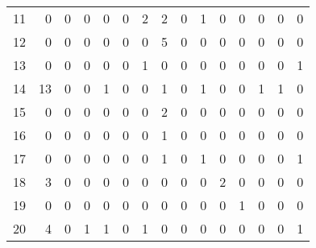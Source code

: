 \begin{tabular}{lrrrrrrrrrrrrrr}
11       &    0 &           0 &               0 &            0 &      0 &        2 &      2 &    0 &    1 &         0 &           0 &       0 &         0 &       0 \\
12       &    0 &           0 &               0 &            0 &      0 &        0 &      5 &    0 &    0 &         0 &           0 &       0 &         0 &       0 \\
13       &    0 &           0 &               0 &            0 &      0 &        1 &      0 &    0 &    0 &         0 &           0 &       0 &         0 &       1 \\
14       &   13 &           0 &               0 &            1 &      0 &        0 &      1 &    0 &    1 &         0 &           0 &       1 &         1 &       0 \\
15       &    0 &           0 &               0 &            0 &      0 &        0 &      2 &    0 &    0 &         0 &           0 &       0 &         0 &       0 \\
16       &    0 &           0 &               0 &            0 &      0 &        0 &      1 &    0 &    0 &         0 &           0 &       0 &         0 &       0 \\
17       &    0 &           0 &               0 &            0 &      0 &        0 &      1 &    0 &    1 &         0 &           0 &       0 &         0 &       1 \\
18       &    3 &           0 &               0 &            0 &      0 &        0 &      0 &    0 &    0 &         2 &           0 &       0 &         0 &       0 \\
19       &    0 &           0 &               0 &            0 &      0 &        0 &      0 &    0 &    0 &         0 &           1 &       0 &         0 &       0 \\
20       &    4 &           0 &               1 &            1 &      0 &        1 &      0 &    0 &    0 &         0 &           0 &       0 &         0 &       1 \\
\bottomrule
\end{tabular}
